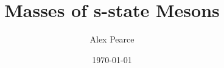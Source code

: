\documentclass[]{article}
\begin{document}
\title{Masses of s-state Mesons}
\author{Alex Pearce}
\date{\today}
\maketitle


\begin{abstract}
\end{abstract}


\begin{thebibliography}{9}
\end{thebibliography}
\end{document}
